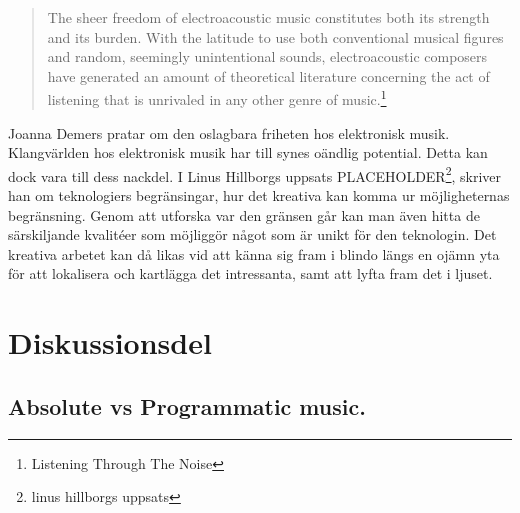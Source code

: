 \documentclass{article}
\begin{document}
\begin{quote}
The sheer freedom of electroacoustic music constitutes both its strength and its burden. With the
latitude to use both conventional musical figures and random, seemingly unintentional sounds,
electroacoustic composers have generated an amount of theoretical literature concerning the act of
listening that is unrivaled in any other genre of music.\footnote{Listening Through The Noise}
\end{quote}


Joanna Demers pratar om den oslagbara friheten hos elektronisk musik. Klangvärlden hos elektronisk musik har
till synes oändlig potential. Detta kan dock vara till dess nackdel. I Linus Hillborgs uppsats
PLACEHOLDER\footnote{linus hillborgs uppsats}, skriver han om teknologiers begränsingar, hur det kreativa
kan komma ur möjligheternas begränsning. Genom att utforska var den gränsen går kan man även hitta de
särskiljande kvalitéer som möjliggör något som är unikt för den teknologin. Det kreativa arbetet kan då likas
vid att känna sig fram i blindo längs en ojämn yta för att lokalisera och kartlägga det intressanta, samt att
lyfta fram det i ljuset. 





\section{Diskussionsdel}
\subsection{Absolute vs Programmatic music.}

\end{document}
